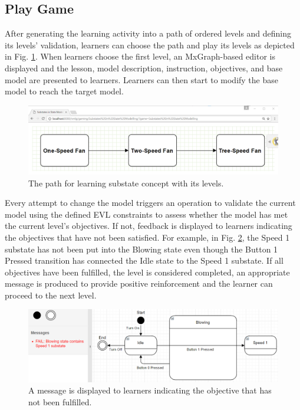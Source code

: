 \documentclass[conference]{IEEEtran}
\begin{document}
\subsection{Play Game}
After generating the learning activity into a path of ordered levels and defining its levels' validation, learners can choose the path and play its levels as depicted in Fig. \ref{path}. When learners choose the first level, an MxGraph-based editor is displayed and the lesson, model description, instruction, objectives, and base model are presented to learners. Learners can then start to modify the base model to reach the target model. 

\begin{figure}[!t]
\centering
\includegraphics[width=\linewidth]{path}
\caption{The path for learning substate concept with its levels.}
\label{path}
\end{figure}    

Every attempt to change the model triggers an operation to validate the current model using the defined EVL constraints to assess whether the model has met the current level's objectives. If not, feedback is displayed to learners indicating the objectives that have not been satisfied. For example, in Fig. \ref{example-fail-messages}, the Speed 1 substate has not been put into the Blowing state even though the Button 1 Pressed transition has connected the Idle state to the Speed 1 substate. If all objectives have been fulfilled, the level is considered completed, an appropriate message is produced to provide positive reinforcement and the learner can proceed to the next level.  

\begin{figure}[!t]
\centering
\includegraphics[width=\linewidth]{example-fail-messages}
\caption{A message is displayed to learners indicating the objective that has not been fulfilled.}
\label{example-fail-messages}
\end{figure}  
\end{document}
